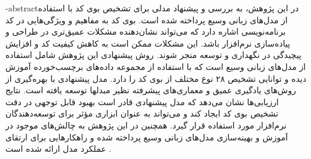 \fa-abstract{در این پژوهش، به بررسی و پیشنهاد مدلی برای تشخیص بوی کد با استفاده از مدل‌های زبانی وسیع پرداخته شده است. بوی کد به مفاهیم و ویژگی‌هایی در کد برنامه‌نویسی اشاره دارد که می‌تواند نشان‌دهنده مشکلات عمیق‌تری در طراحی و پیاده‌سازی نرم‌افزار باشد. این مشکلات ممکن است به کاهش کیفیت کد و افزایش پیچیدگی در نگهداری و توسعه منجر شوند. روش پیشنهادی این پژوهش شامل استفاده از مدل‌های زبانی وسیع است که با استفاده از مجموعه داده‌های برچسب‌خورده آموزش دیده و توانایی تشخیص ۲۸ نوع مختلف از بوی کد را دارد. مدل پیشنهادی با بهره‌گیری از روش‌های یادگیری عمیق و معماری‌های پیشرفته نظیر مبدلها توسعه یافته است. نتایج ارزیابی‌ها نشان می‌دهد که مدل پیشنهادی قادر است بهبود قابل توجهی در دقت تشخیص بوی کد ایجاد کند و می‌تواند به عنوان ابزاری مؤثر برای توسعه‌دهندگان نرم‌افزار مورد استفاده قرار گیرد. همچنین در این پژوهش به چالش‌های موجود در آموزش و بهینه‌سازی مدل‌های زبانی وسیع پرداخته شده و راهکارهایی برای ارتقای عملکرد مدل ارائه شده است .}

\abstractPage

\newpage\clearpage